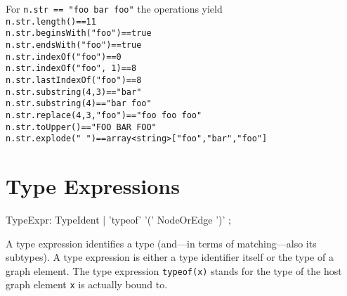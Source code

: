 \begin{example}
For \texttt{n.str == "foo bar foo"} the operations yield \\
\texttt{n.str.length()==11} \\
\texttt{n.str.beginsWith("foo")==true} \\
\texttt{n.str.endsWith("foo")==true} \\
\texttt{n.str.indexOf("foo")==0} \\
\texttt{n.str.indexOf("foo", 1)==8} \\
\texttt{n.str.lastIndexOf("foo")==8} \\
\texttt{n.str.substring(4,3)=="bar"} \\
\texttt{n.str.substring(4)=="bar foo"} \\
\texttt{n.str.replace(4,3,"foo")=="foo foo foo"} \\
\texttt{n.str.toUpper()=="FOO BAR FOO"} \\
\texttt{n.str.explode(" ")==array<string>["foo","bar","foo"]} \\
\end{example}


\section{Type Expressions}
\label{typeexpressions}

\begin{rail}
  TypeExpr: TypeIdent | 'typeof' '(' NodeOrEdge ')' ;
\end{rail}
A type expression identifies a type (and---in terms of matching---also its subtypes).
A type expression is either a type identifier itself or the type of a graph element.
The type expression \texttt{typeof(x)} stands for the type of the host graph element \texttt{x} is actually bound to.

